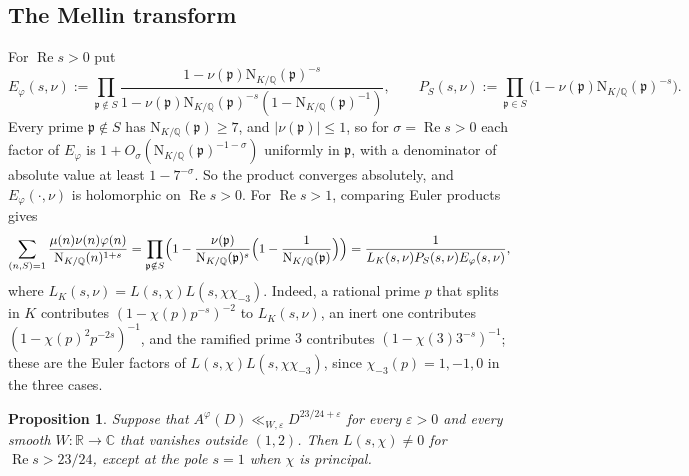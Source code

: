 \documentclass[11pt,a4paper]{article}
\numberwithin{equation}{section}
\numberwithin{figure}{section}
\newtheorem{proposition}[theorem]{Proposition}
\theoremstyle{definition}
\theoremstyle{remark}
\newcommand{\Q}{\mathbb Q}
\newcommand{\R}{\mathbb R}
\newcommand{\NK}{\mathrm N_{K/\Q}}
\newcommand{\C}{\mathbb C}
\newcommand{\Rea}{\operatorname{Re}}
\begin{document}
\subsection{The Mellin transform}
For $\Rea s>0$ put
\[
 E_\varphi(s,\nu):=\prod_{\mathfrak p\notin S}
 \frac{1-\nu(\mathfrak p)\NK(\mathfrak p)^{-s}}{1-\nu(\mathfrak p)\NK(\mathfrak p)^{-s}(1-\NK(\mathfrak p)^{-1})},
 \qquad
 P_S(s,\nu):=\prod_{\mathfrak p\in S}\bigl(1-\nu(\mathfrak p)\NK(\mathfrak p)^{-s}\bigr).
\]
Every prime $\mathfrak p\notin S$ has $\NK(\mathfrak p)\ge7$, and $|\nu(\mathfrak p)|\le1$, so for
$\sigma=\Rea s>0$ each factor of $E_\varphi$ is $1+O_\sigma(\NK(\mathfrak p)^{-1-\sigma})$ uniformly
in $\mathfrak p$, with a denominator of absolute value at least $1-7^{-\sigma}$. So the product
converges absolutely, and $E_\varphi(\cdot,\nu)$ is holomorphic on $\Rea s>0$. For $\Rea s>1$,
comparing Euler products gives
\begin{equation}\label{eq:weighted-euler}
 \sum_{(n,S)=1}\frac{\mu(n)\nu(n)\varphi(n)}{\NK(n)^{1+s}}
 =\prod_{\mathfrak p\notin S}\Bigl(1-\frac{\nu(\mathfrak p)}{\NK(\mathfrak p)^{s}}\Bigl(1-\frac1{\NK(\mathfrak p)}\Bigr)\Bigr)
 =\frac1{L_K(s,\nu)P_S(s,\nu)E_\varphi(s,\nu)},
\end{equation}
where $L_K(s,\nu)=L(s,\chi)L(s,\chi\chi_{-3})$. Indeed, a rational prime $p$ that splits in $K$
contributes $(1-\chi(p)p^{-s})^{-2}$ to $L_K(s,\nu)$, an inert one contributes
$(1-\chi(p)^2p^{-2s})^{-1}$, and the ramified prime $3$ contributes $(1-\chi(3)3^{-s})^{-1}$;
these are the Euler factors of $L(s,\chi)L(s,\chi\chi_{-3})$, since $\chi_{-3}(p)=1,-1,0$ in the
three cases.

\begin{proposition}\label{prop:mellin}
Suppose that $A^\varphi(D)\ll_{W,\varepsilon}D^{23/24+\varepsilon}$ for every $\varepsilon>0$ and
every smooth $W:\R\to\C$ that vanishes outside $(1,2)$. Then $L(s,\chi)\ne0$ for
$\Rea s>23/24$, except at the pole $s=1$ when $\chi$ is principal.
\end{proposition}
\end{document}
